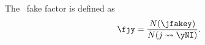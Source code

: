 

The \jfakey\ fake factor is defined as
\begin{equation}
    \fjy=\frac{N(\jfakey)}{N(j\rightsquigarrow\yNI)}.
\label{eq:def-fey-fjy}
\end{equation}

